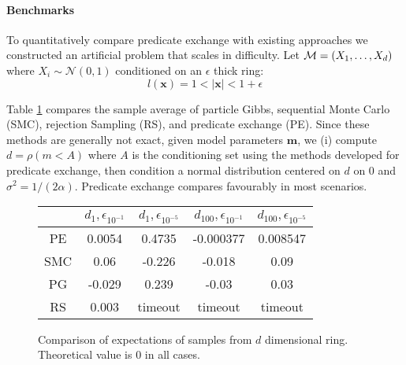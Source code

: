 \paragraph{Benchmarks}
To quantitatively compare predicate exchange with existing approaches we constructed an artificial problem that scales in difficulty.
Let ${\mathcal{M}} = (X_1, \dots, X_d)$ where $X_i \sim \mathcal{N}(0,1)$ conditioned on an $\epsilon$ thick ring:
\begin{equation}
l(\textbf{x}) = 1 < |\textbf{x}| < 1 + \epsilon
\end{equation}

Table \ref{results} compares the sample average of particle Gibbs, sequential Monte Carlo (SMC), rejection Sampling (RS), and predicate exchange (PE).
Since these methods are generally not exact, given model parameters $\textbf{m}$, we (i) compute $d = \rho(m< A)$ where $A$ is the conditioning set using the methods developed for predicate exchange, then condition a normal distribution centered on $d$ on 0 and $\sigma^2 = 1/(2\alpha)$.
Predicate exchange  compares favourably in most scenarios.


\begin{figure}
\begin{center}
	\begin{tabular}{||c| c c c c||} 
	\hline
	 & $d_1, \epsilon_{10^{-1}}$ & $d_1, \epsilon_{10^{-5}}$ & $d_{100}, \epsilon_{10^{-1}}$ & $d_{100}, \epsilon_{10^{-5}}$ \\ [0.5ex] 
	\hline\hline
	PE & 0.0054 & 0.4735  & -0.000377 & 0.008547\\ 
	\hline
	SMC & 0.06 & -0.226  & -0.018 & 0.09\\ 
	\hline
	PG & -0.029 & 0.239 & -0.03 & 0.03\\
	\hline
	RS & 0.003 & timeout & timeout & timeout \\
	\hline
 \end{tabular}
 \label{results}
 \caption{Comparison of expectations of samples from $d$ dimensional ring.  Theoretical value is 0 in all cases.}
 \end{center}
\end{figure}


  